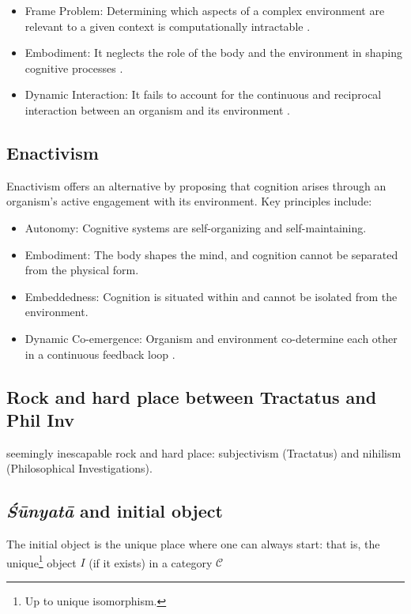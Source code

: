 \documentclass{article}
\begin{document}
\begin{itemize}
    \item Frame Problem: Determining which aspects of a complex environment are relevant to a given context is computationally intractable \cite{pylyshyn1987}.
    \item Embodiment: It neglects the role of the body and the environment in shaping cognitive processes \cite{clark1997}.
    \item Dynamic Interaction: It fails to account for the continuous and reciprocal interaction between an organism and its environment \cite{thompson2007}.
\end{itemize}

\subsection{Enactivism}

Enactivism offers an alternative by proposing that cognition arises through an organism's active engagement with its environment. Key principles include:

\begin{itemize} \item Autonomy: Cognitive systems are self-organizing and self-maintaining. \item Embodiment: The body shapes the mind, and cognition cannot be separated from the physical form. \item Embeddedness: Cognition is situated within and cannot be isolated from the environment. \item Dynamic Co-emergence: Organism and environment co-determine each other in a continuous feedback loop \cite{varela1991}. \end{itemize}


\subsection{Rock and hard place between Tractatus and Phil Inv}
seemingly inescapable rock and hard place: subjectivism (Tractatus) and nihilism (Philosophical Investigations).


\subsection{\emph{Śūnyatā} and initial object}
The initial object is the unique place where one can always start: that is, the unique\footnote{Up to unique isomorphism.} object $I$ (if it exists) in a category $\mathcal{C}$
\end{document}
